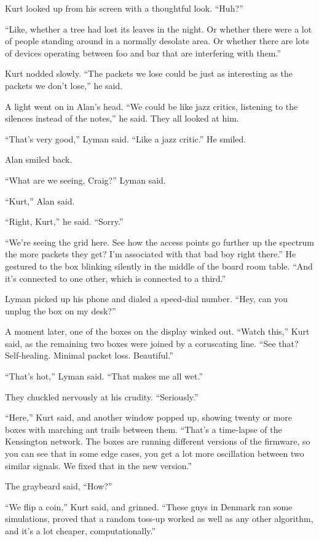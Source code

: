 \documentclass{article}
\begin{document}
Kurt looked up from his screen with a thoughtful look.  ``Huh?''

``Like, whether a tree had lost its leaves in the night.  Or whether
there were a lot of people standing around in a normally desolate
area.  Or whether there are lots of devices operating between foo and
bar that are interfering with them.''

Kurt nodded slowly.  ``The packets we lose could be just as
interesting as the packets we don't lose,'' he said.

A light went on in Alan's head.  ``We could be like jazz critics,
listening to the silences instead of the notes,'' he said.  They all
looked at him.

``That's very good,'' Lyman said.  ``Like a jazz critic.'' He smiled.

Alan smiled back.

``What are we seeing, Craig?'' Lyman said.

``Kurt,'' Alan said.

``Right, Kurt,'' he said.  ``Sorry.''

``We're seeing the grid here.  See how the access points go further up
the spectrum the more packets they get?  I'm associated with that bad
boy right there.'' He gestured to the box blinking silently in the
middle of the board room table.  ``And it's connected to one other,
which is connected to a third.''

Lyman picked up his phone and dialed a speed-dial number.  ``Hey, can
you unplug the box on my desk?''

A moment later, one of the boxes on the display winked out.  ``Watch
this,'' Kurt said, as the remaining two boxes were joined by a
coruscating line.  ``See that?  Self-healing.  Minimal packet loss. 
Beautiful.''

``That's hot,'' Lyman said.  ``That makes me all wet.''

They chuckled nervously at his crudity.  ``Seriously.''

``Here,'' Kurt said, and another window popped up, showing twenty or
more boxes with marching ant trails between them.  ``That's a
time-lapse of the Kensington network.  The boxes are running different
versions of the firmware, so you can see that in some edge cases, you
get a lot more oscillation between two similar signals.  We fixed that
in the new version.''

The graybeard said, ``How?''

``We flip a coin,'' Kurt said, and grinned.  ``These guys in Denmark
ran some simulations, proved that a random toss-up worked as well as
any other algorithm, and it's a lot cheaper, computationally.''
\end{document}
